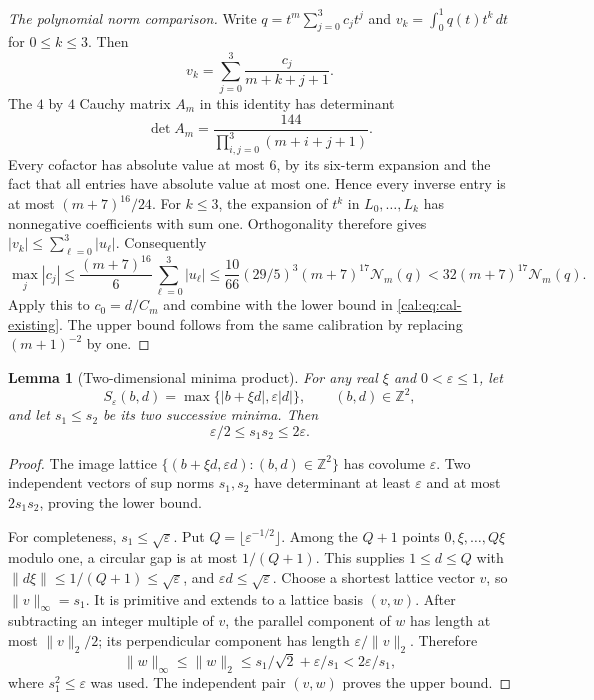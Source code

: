 \documentclass[11pt,a4paper]{article}
\numberwithin{equation}{section}
\newtheorem{lemma}[theorem]{Lemma}
\theoremstyle{definition}\newtheorem{definition}[theorem]{Definition}
\theoremstyle{remark}\newtheorem{remark}[theorem]{Remark}
\begin{document}
\begin{proof}[The polynomial norm comparison]
Write $q=t^m\sum_{j=0}^3c_jt^j$ and
$v_k=\int_0^1q(t)t^k\,dt$ for $0\le k\le3$. Then
\[
 v_k=\sum_{j=0}^3\frac{c_j}{m+k+j+1}.
\]
The $4$ by $4$ Cauchy matrix $A_m$ in this identity has determinant
\[
 \det A_m=\frac{144}{\prod_{i,j=0}^3(m+i+j+1)}.
\]
Every cofactor has absolute value at most $6$, by its six-term
expansion and the fact that all entries have absolute value at most one.
Hence every inverse entry is at most $(m+7)^{16}/24$.
For $k\le3$, the expansion of $t^k$ in $L_0,\ldots,L_k$ has
nonnegative coefficients with sum one. Orthogonality therefore gives
$|v_k|\le\sum_{\ell=0}^3|u_\ell|$. Consequently
\[
 \max_j|c_j|\le\frac{(m+7)^{16}}6\sum_{\ell=0}^3|u_\ell|
 \le\frac{10}{66}(29/5)^3(m+7)^{17}\mathcal N_m(q)
 <32(m+7)^{17}\mathcal N_m(q).
\]
Apply this to $c_0=d/C_m$ and combine with the lower bound in
\eqref{cal:eq:cal-existing}. The upper bound follows from the same
calibration by replacing $(m+1)^{-2}$ by one.
\end{proof}

\begin{lemma}[Two-dimensional minima product]\label{cal:lem:two-minima}
For any real $\xi$ and $0<\varepsilon\le1$, let
\[
 S_\varepsilon(b,d)=\max\{|b+\xi d|,\varepsilon|d|\},
 \qquad (b,d)\in\mathbb Z^2,
\]
and let $s_1\le s_2$ be its two successive minima. Then
\[
 \varepsilon/2\le s_1s_2\le2\varepsilon.
\]
\end{lemma}
\begin{proof}
The image lattice
$\{(b+\xi d,\varepsilon d):(b,d)\in\mathbb Z^2\}$
has covolume $\varepsilon$. Two independent vectors of sup norms
$s_1,s_2$ have determinant at least $\varepsilon$ and at most
$2s_1s_2$, proving the lower bound.

For completeness, $s_1\le\sqrt\varepsilon$. Put
$Q=\lfloor\varepsilon^{-1/2}\rfloor$. Among the $Q+1$ points
$0,\xi,\ldots,Q\xi$ modulo one, a circular gap is at most
$1/(Q+1)$. This supplies $1\le d\le Q$ with
$\|d\xi\|\le1/(Q+1)\le\sqrt\varepsilon$, and
$\varepsilon d\le\sqrt\varepsilon$.
Choose a shortest lattice vector $v$, so $\|v\|_\infty=s_1$.
It is primitive and extends to a lattice basis $(v,w)$.
After subtracting an integer multiple of $v$, the parallel component
of $w$ has length at most $\|v\|_2/2$; its perpendicular component
has length $\varepsilon/\|v\|_2$. Therefore
\[
 \|w\|_\infty\le\|w\|_2
 \le s_1/\sqrt2+\varepsilon/s_1
 <2\varepsilon/s_1,
\]
where $s_1^2\le\varepsilon$ was used. The independent pair $(v,w)$
proves the upper bound.
\end{proof}
\end{document}
